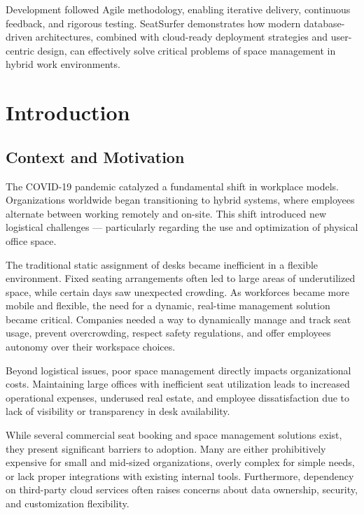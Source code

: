 \documentclass[12pt,a4paper]{report}
\begin{document}
Development followed Agile methodology, enabling iterative delivery, continuous feedback, and rigorous testing. SeatSurfer demonstrates how modern database-driven architectures, combined with cloud-ready deployment strategies and user-centric design, can effectively solve critical problems of space management in hybrid work environments.

\vspace{0.5cm}

\tableofcontents
\newpage

\chapter{Introduction}

\section{Context and Motivation}

The COVID-19 pandemic catalyzed a fundamental shift in workplace models. Organizations worldwide began transitioning to hybrid systems, where employees alternate between working remotely and on-site. This shift introduced new logistical challenges — particularly regarding the use and optimization of physical office space.

The traditional static assignment of desks became inefficient in a flexible environment. Fixed seating arrangements often led to large areas of underutilized space, while certain days saw unexpected crowding. As workforces became more mobile and flexible, the need for a dynamic, real-time management solution became critical. Companies needed a way to dynamically manage and track seat usage, prevent overcrowding, respect safety regulations, and offer employees autonomy over their workspace choices.

Beyond logistical issues, poor space management directly impacts organizational costs. Maintaining large offices with inefficient seat utilization leads to increased operational expenses, underused real estate, and employee dissatisfaction due to lack of visibility or transparency in desk availability.

While several commercial seat booking and space management solutions exist, they present significant barriers to adoption. Many are either prohibitively expensive for small and mid-sized organizations, overly complex for simple needs, or lack proper integrations with existing internal tools. Furthermore, dependency on third-party cloud services often raises concerns about data ownership, security, and customization flexibility.
\end{document}
